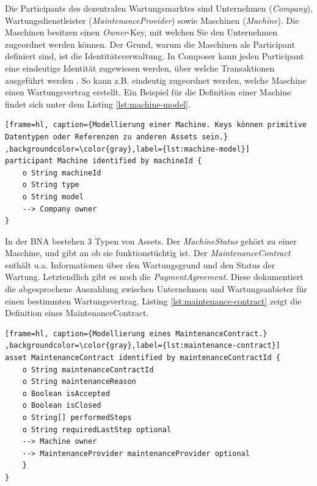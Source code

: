 Die Participants des dezentralen Wartungsmarktes sind Unternehmen (\textit{Company}), Wartungsdienstleister (\textit{MaintenanceProvider}) sowie Maschinen (\textit{Machine}). Die Maschinen besitzen einen \textit{Owner}-Key, mit welchen Sie den Unternehmen zugeordnet werden können. Der Grund, warum die Maschinen als Participant definiert sind, ist die Identitätsverwaltung. In Composer kann jeden Participant eine eindeutige Identität zugewiesen werden, über welche Transaktionen ausgeführt werden \cite{HyperledgerComposerTeamParticipantsidentitiesHyperledger}. So kann z.B. eindeutig zugeordnet werden, welche Maschine einen Wartungsvertrag erstellt. Ein Beispiel für die Definition einer Machine findet sich unter dem Listing \ref{lst:machine-model}.

\begin{lstfloat}
\begin{lstlisting}[frame=hl, caption={Modellierung einer Machine. Keys können primitive Datentypen oder Referenzen zu anderen Assets sein.} ,backgroundcolor=\color{gray},label={lst:machine-model}]
participant Machine identified by machineId {
    o String machineId
    o String type
    o String model
    --> Company owner
}
\end{lstlisting} 
\end{lstfloat}

In der BNA bestehen 3 Typen von Assets. Der \textit{MachineStatus} gehört zu einer Maschine, und gibt an ob sie funktionstüchtig ist. Der \textit{MaintenanceContract} enthält u.a. Informationen über den Wartungsgrund und den Status der Wartung. Letztendlich gibt es noch die \textit{PaymentAgreement}. Diese dokumentiert die abgesprochene Auszahlung zwischen Unternehmen und Wartungsanbieter für einen bestimmten Wartungsvertrag. Listing \ref{lst:maintenance-contract} zeigt die Definition eines MaintenanceContract.

\begin{lstfloat}
\begin{lstlisting}[frame=hl, caption={Modellierung eines MaintenanceContract.} ,backgroundcolor=\color{gray},label={lst:maintenance-contract}]
asset MaintenanceContract identified by maintenanceContractId {
    o String maintenanceContractId
    o String maintenanceReason
    o Boolean isAccepted
    o Boolean isClosed
    o String[] performedSteps
    o String requiredLastStep optional
    --> Machine owner
    --> MaintenanceProvider maintenanceProvider optional
    }
}
\end{lstlisting} 
\end{lstfloat}

